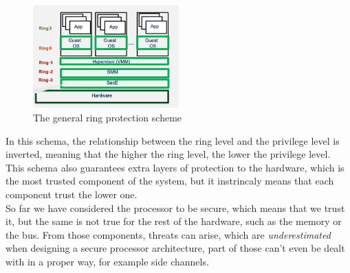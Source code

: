 \begin{figure}[H]
  \centering
  \includegraphics[width=0.5\textwidth]{img/hardware/ring protection scheme.png}
  \caption{The general ring protection scheme}
\end{figure}
In this schema, the relationship between the ring level and the privilege level is inverted, meaning
that the higher the ring level, the lower the privilege level. This schema also guarantees extra
layers of protection to the hardware, which is the most trusted component of the system, but it
instrincaly means that each component trust the lower one.\\
So far we have considered the processor to be secure, which means that we trust it, but the same is
not true for the rest of the hardware, such as the memory or the bus. From those components, threats
can arise, which are \textit{underestimated} when designing a secure processor architecture, part of
those can't even be dealt with in a proper way, for example side channels.
